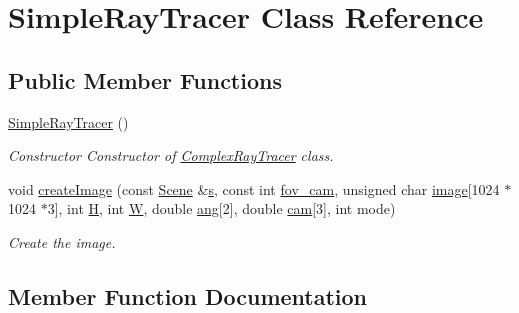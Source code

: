 \hypertarget{classSimpleRayTracer}{}\section{Simple\+Ray\+Tracer Class Reference}
\label{classSimpleRayTracer}
\subsection*{Public Member Functions}
\begin{DoxyCompactItemize}
\item 
\mbox{\label{classSimpleRayTracer_a6117db089b4a4bad8a54d45bc5bad860}} 
\hyperlink{classSimpleRayTracer_a6117db089b4a4bad8a54d45bc5bad860}{Simple\+Ray\+Tracer} ()
\begin{DoxyCompactList}\small\item\em Constructor Constructor of \hyperlink{classComplexRayTracer}{Complex\+Ray\+Tracer} class. \end{DoxyCompactList}\item 
void \hyperlink{classSimpleRayTracer_ab4ec3605644b1c19328c2ec88d4ddd4a}{create\+Image} (const \hyperlink{classScene}{Scene} \&\hyperlink{Main_8cpp_aecc1396fc611f6e71d5d70228e7b089a}{s}, const int \hyperlink{Main_8cpp_afac324b61ac0563c734fcdb81d98e344}{fov\+\_\+cam}, unsigned char \hyperlink{Main_8cpp_a92ebae258b9cd4407b2510c3d18633ee}{image}\mbox{[}1024 $\ast$1024 $\ast$3\mbox{]}, int \hyperlink{Main_8cpp_affa487e8e3cc48473cfc05c0ce0165e9}{H}, int \hyperlink{Main_8cpp_a2dd51e03005d5cb52315290d27f61870}{W}, double \hyperlink{Main_8cpp_a861ee06bf1e430650b4437260a119635}{ang}\mbox{[}2\mbox{]}, double \hyperlink{Main_8cpp_a9fe883a18727d129289b149e5f0305eb}{cam}\mbox{[}3\mbox{]}, int mode)
\begin{DoxyCompactList}\small\item\em Create the image. \end{DoxyCompactList}\end{DoxyCompactItemize}


\subsection{Member Function Documentation}
\mbox{\label{classSimpleRayTracer_ab4ec3605644b1c19328c2ec88d4ddd4a}} 
